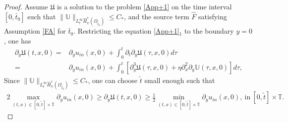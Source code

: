 \documentclass{amsart}
\numberwithin{equation}{section}
\begin{document}
\begin{proof}
Assume $\mathfrak{U}$ is a solution to the problem \eqref{App+1} on the time interval $[0,\bar{t}_{0}]$ such that
$\|\mathbb{U}\|_{L_{t}^{\infty}\hat{H}_{\psi}^{s}(\Omega_{\bar{t}_{0}})}\leq C_{*}$,
and the source term $\hat{F}$ satisfying Assumption \ref{FA} for $\bar{t}_{0}$.
Restricting the equation \eqref{App+1}$_{1}$ to the boundary $y=0$, one has
\begin{align*}
\partial_{y}\mathfrak{U}(t,x,0)
=& \partial_{y}u_{in}(x,0)+\int_{0}^{t}\partial_{t}\partial_{y}\mathfrak{U}(\tau,x,0)d\tau\\
=& \partial_{y}u_{in}(x,0)+\int_{0}^{t}[\partial_{y}^{3}\mathfrak{U}(\tau,x,0)+\eta\partial_{x}^{2}\partial_{y}\mathbb{U}(\tau,x,0)]d\tau,
\end{align*}
Since $\|\mathbb{U}\|_{L_{t}^{\infty}\hat{H}_{\psi}^{s}(\Omega_{\bar{t}_{0}})}\leq C_{*}$, one can choose $\tilde{t}$ small enough such that
\begin{align}\label{dotu0}
2\max_{(t,x)\in[0,\tilde{t}]\times\mathbb{T}}\partial_{y}u_{in}(x,0)
\geq \partial_{y}\mathfrak{U}(t,x,0)
\geq \frac{1}{2}\min_{(t,x)\in[0,\tilde{t}]\times\mathbb{T}}\partial_{y}u_{in}(x,0), ~\text{in}~[0,\tilde{t}]\times\mathbb{T}.
\end{align}


\end{proof}
\end{document}
